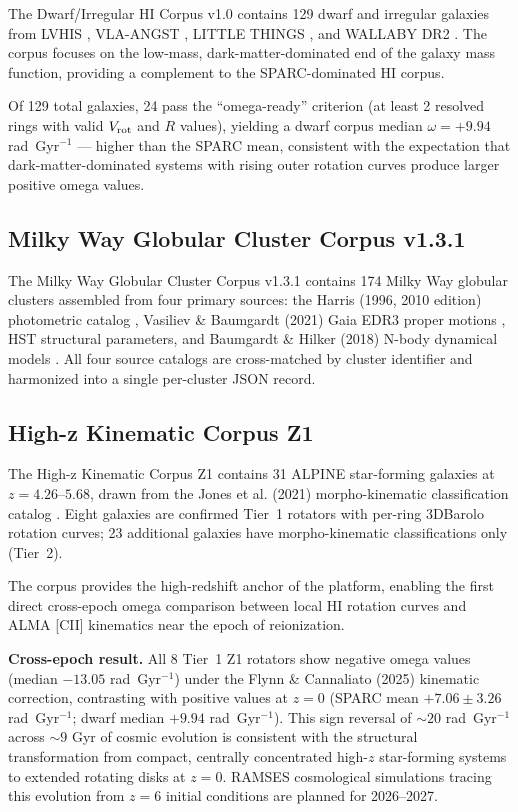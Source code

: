\documentclass[twocolumn]{aastex631}
\begin{document}
The Dwarf/Irregular HI Corpus v1.0 \citep{flynn2026_dwarfs} contains 129
dwarf and irregular galaxies from LVHIS \citep{koribalski2018}, VLA-ANGST
\citep{ott2012}, LITTLE THINGS \citep{oh2015}, and WALLABY DR2
\citep{koribalski2020}. The corpus focuses on the low-mass, dark-matter-dominated
end of the galaxy mass function, providing a complement to the SPARC-dominated
HI corpus.

Of 129 total galaxies, 24 pass the ``omega-ready'' criterion (at least 2
resolved rings with valid $V_{\rm rot}$ and $R$ values), yielding a dwarf
corpus median $\omega = +9.94$ rad~Gyr$^{-1}$ --- higher than the SPARC mean,
consistent with the expectation that dark-matter-dominated systems with
rising outer rotation curves produce larger positive omega values.

\subsection{Milky Way Globular Cluster Corpus v1.3.1}
\label{sec:gc}

The Milky Way Globular Cluster Corpus v1.3.1 \citep{flynn2026_gc} contains
174 Milky Way globular clusters assembled from four primary sources: the
Harris (1996, 2010 edition) photometric catalog \citep{harris1996}, Vasiliev
\& Baumgardt (2021) Gaia EDR3 proper motions \citep{vasiliev2021}, HST structural
parameters, and Baumgardt \& Hilker (2018) N-body dynamical models
\citep{baumgardt2018}. All four source catalogs are cross-matched by cluster
identifier and harmonized into a single per-cluster JSON record.

\subsection{High-z Kinematic Corpus Z1}
\label{sec:z1}

The High-z Kinematic Corpus Z1 \citep{flynn2026_z1} contains 31 ALPINE
\citep{lefevre2020} star-forming galaxies at $z = 4.26$--$5.68$, drawn from
the Jones et al. (2021) morpho-kinematic classification catalog
\citep{jones2021}. Eight galaxies are confirmed Tier~1 rotators with per-ring
3DBarolo rotation curves; 23 additional galaxies have morpho-kinematic
classifications only (Tier~2).

The corpus provides the high-redshift anchor of the platform, enabling the
first direct cross-epoch omega comparison between local HI rotation curves
and ALMA [CII] kinematics near the epoch of reionization.

\textbf{Cross-epoch result.} All 8 Tier~1 Z1 rotators show negative omega
values (median $-13.05$ rad~Gyr$^{-1}$) under the Flynn \& Cannaliato (2025)
kinematic correction, contrasting with positive values at $z = 0$ (SPARC mean
$+7.06 \pm 3.26$ rad~Gyr$^{-1}$; dwarf median $+9.94$ rad~Gyr$^{-1}$). This
sign reversal of $\sim 20$ rad~Gyr$^{-1}$ across $\sim 9$ Gyr of cosmic
evolution is consistent with the structural transformation from compact,
centrally concentrated high-$z$ star-forming systems to extended rotating
disks at $z = 0$. RAMSES cosmological simulations tracing this evolution from
$z = 6$ initial conditions are planned for 2026--2027.
\end{document}
